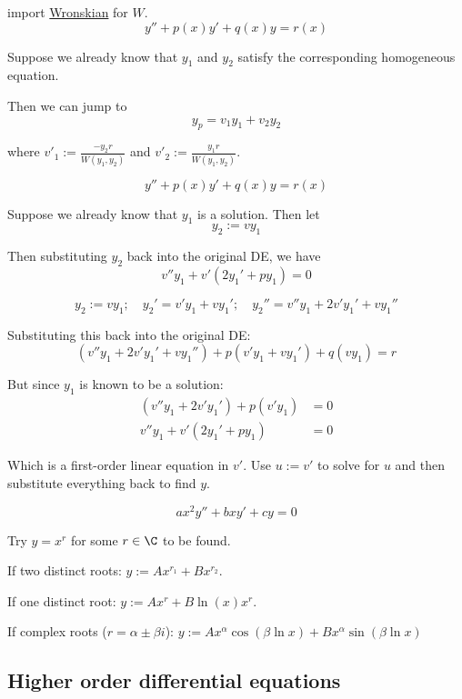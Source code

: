 \label{cc51fcb}

import \href{b70073b}{Wronskian} for $W$.
$$
  y''+p(x)y'+q(x)y=r(x)
$$

Suppose we already know that $y_1$ and $y_2$ satisfy the corresponding
homogeneous equation.

Then we can jump to
$$
  y_p=v_1y_1+v_2y_2
$$

where $\displaystyle v'_1:=\frac{-y_2r}{W(y_1,y_2)}$ and $\displaystyle
v'_2:=\frac{y_1r}{W(y_1,y_2)}$.

\label{d359b97}

$$
  y''+p(x)y'+q(x)y=r(x)
$$

Suppose we already know that $y_1$ is a solution. Then let
$$
  y_2:=vy_1
$$

Then substituting $y_2$ back into the original DE, we have
$$
  v''y_1+v'(2y_1'+py_1)=0
$$

\begin{compute}
  $$
    y_2:=vy_1;\quad y_2'=v'y_1+vy_1';\quad y_2''=v''y_1+2v'y_1'+vy_1''
  $$

  Substituting this back into the original DE:
  $$
    (v''y_1+2v'y_1'+vy_1'')+p(v'y_1+vy_1')+q(vy_1)=r
  $$

  But since $y_1$ is known to be a solution:
  \begin{align*}
    (v''y_1+2v'y_1')+p(v'y_1) &=0 \\
    v''y_1+v'(2y_1'+py_1)     &=0
  \end{align*}
\end{compute}

Which is a first-order linear equation in $v'$. Use $u:=v'$ to solve for $u$
and then substitute everything back to find $y$.

\label{c15a777}

$$
  ax^2y''+bxy'+cy=0
$$

Try $y=x^r$ for some $r\in\C$ to be found.

If two distinct roots: $y:=Ax^{r_1}+Bx^{r_2}$.

If one distinct root: $y:=Ax^r+B\ln(x)x^r$.

If complex roots ($r=\alpha\pm\beta i$): $y:=Ax^\alpha\cos(\beta\ln
x)+Bx^\alpha\sin(\beta\ln x)$

\subsection{Higher order differential equations}\label{cca5f46}

